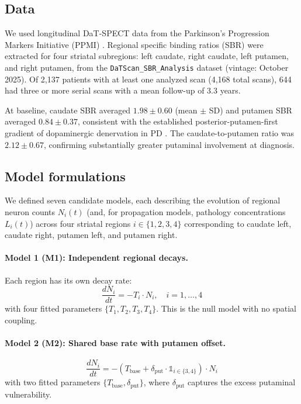 \subsection{Data}

We used longitudinal DaT-SPECT data from the Parkinson's Progression Markers Initiative (PPMI) \cite{ppmi2011}. Regional specific binding ratios (SBR) were extracted for four striatal subregions: left caudate, right caudate, left putamen, and right putamen, from the \texttt{DaTScan\_SBR\_Analysis} dataset (vintage: October 2025). Of 2,137 patients with at least one analyzed scan (4,168 total scans), 644 had three or more serial scans with a mean follow-up of 3.3 years.

At baseline, caudate SBR averaged $1.98 \pm 0.60$ (mean $\pm$ SD) and putamen SBR averaged $0.84 \pm 0.37$, consistent with the established posterior-putamen-first gradient of dopaminergic denervation in PD \cite{brooks1990}. The caudate-to-putamen ratio was $2.12 \pm 0.67$, confirming substantially greater putaminal involvement at diagnosis.

\subsection{Model formulations}

We defined seven candidate models, each describing the evolution of regional neuron counts $N_i(t)$ (and, for propagation models, pathology concentrations $L_i(t)$) across four striatal regions $i \in \{1,2,3,4\}$ corresponding to caudate left, caudate right, putamen left, and putamen right.

\paragraph{Model 1 (M1): Independent regional decays.} Each region has its own decay rate:
\begin{equation}
\frac{dN_i}{dt} = -T_i \cdot N_i, \quad i = 1,\ldots,4
\label{eq:m1}
\end{equation}
with four fitted parameters $\{T_1, T_2, T_3, T_4\}$. This is the null model with no spatial coupling.

\paragraph{Model 2 (M2): Shared base rate with putamen offset.}
\begin{equation}
\frac{dN_i}{dt} = -(T_{\text{base}} + \delta_{\text{put}} \cdot \mathbb{1}_{i \in \{3,4\}}) \cdot N_i
\label{eq:m2}
\end{equation}
with two fitted parameters $\{T_{\text{base}}, \delta_{\text{put}}\}$, where $\delta_{\text{put}}$ captures the excess putaminal vulnerability.

